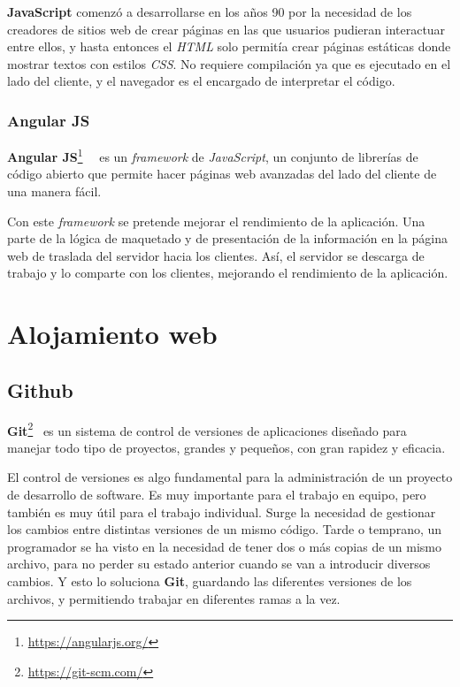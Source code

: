 \documentclass[a4paper, 12pt]{book}
\begin{document}
\textbf{JavaScript} comenzó a desarrollarse en los años 90 por la necesidad de los creadores de sitios web de crear páginas en las que usuarios pudieran interactuar entre ellos, y hasta entonces el \textit{HTML} solo permitía crear páginas estáticas donde mostrar textos con estilos \textit{CSS}. No requiere compilación ya que es ejecutado en el lado del cliente, y el navegador es el encargado de interpretar el código. 

\subsubsection{Angular JS} 
\label{subsubsec:angular-js}

\textbf{Angular JS}\footnote{\url{https://angularjs.org/}}~\cite{pagina-angularjs}~\cite{Lerner:_ng-book} es un \textit{framework} de \textit{JavaScript}, un conjunto de librerías de código abierto que permite hacer páginas web avanzadas del lado del cliente de una manera fácil.
\newline

Con este \textit{framework} se pretende mejorar el rendimiento de la aplicación. Una parte de la lógica de maquetado y de presentación de la información en la página web de traslada del servidor hacia los clientes. Así, el servidor se descarga de trabajo y lo comparte con los clientes, mejorando el rendimiento de la aplicación.


\section{Alojamiento web} 
\label{sec:alojamiento-web}


\subsection{Github} 
\label{subsec:github}

\textbf{Git}\footnote{\url{https://git-scm.com/}}~\cite{pagina-git} es un sistema de control de versiones de aplicaciones diseñado para manejar todo tipo de proyectos, grandes y pequeños, con gran rapidez y eficacia.
\newline

El control de versiones es algo fundamental para la administración de un proyecto de desarrollo de software. Es muy importante para el trabajo en equipo, pero también es muy útil para el trabajo individual. Surge la necesidad de gestionar los cambios entre distintas versiones de un mismo código. Tarde o temprano, un programador se ha visto en la necesidad de tener dos o más copias de un mismo archivo, para no perder su estado anterior cuando se van a introducir diversos cambios. Y esto lo soluciona \textbf{Git}, guardando las diferentes versiones de los archivos, y permitiendo trabajar en diferentes ramas a la vez.
\newline
\end{document}
